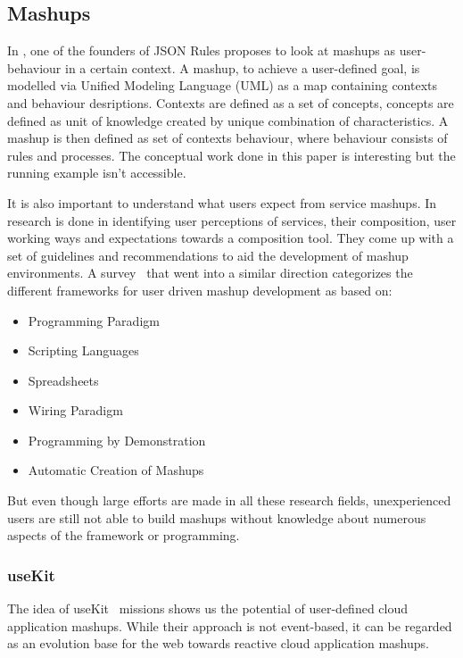 \documentclass[11pt]{article}%
\begin{document}
\subsection{Mashups}
In \cite{2011-Pascalau-MBC.pdf}, one of the founders of JSON Rules proposes to look at mashups as user-behaviour in a certain context. A mashup, to achieve a user-defined goal, is modelled via Unified Modeling Language (UML) as a map containing contexts and behaviour desriptions. Contexts are defined as a set of concepts, concepts are defined as unit of knowledge created by unique combination of characteristics. A mashup is then defined as  set of contexts behaviour, where behaviour consists of rules and processes. The conceptual work done in this paper is interesting but the running example isn't accessible.

It is also important to understand what users expect from service mashups. In \cite{2010-Namoun_etal-EURCW.pdf} research is done in identifying user perceptions of services, their composition, user working ways and expectations towards a composition tool. They come up with a set of guidelines and recommendations to aid the development of mashup environments. A survey~\cite{2009-Fischer_etal-OCAMG.pdf} that went into a similar direction categorizes the different frameworks for user driven mashup development as based on:
 \begin{itemize}
  \item Programming Paradigm
  \item Scripting Languages
  \item Spreadsheets
  \item Wiring Paradigm
  \item Programming by Demonstration
  \item Automatic Creation of Mashups
\end{itemize}
But even though large efforts are made in all these research fields, unexperienced users are still not able to build mashups without knowledge about numerous aspects of the framework or programming.

\subsubsection{useKit}
The idea of useKit~\cite{2010-Rizzotti_Burkhart-useKit.pdf} missions shows us the potential of user-defined cloud application mashups. While their approach is not event-based, it can be regarded as an evolution base for the web towards reactive cloud application mashups.
\end{document}
